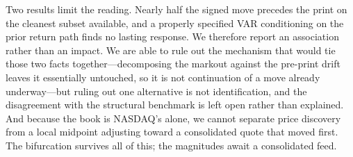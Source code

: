 \documentclass[11pt]{article}
\begin{document}
Two results limit the reading. Nearly half the signed move precedes the print on the cleanest
subset available, and a properly specified VAR conditioning on the prior return path finds no
lasting response. We therefore report an association rather than an impact. We are able to
rule out the mechanism that would tie those two facts together---decomposing the markout
against the pre-print drift leaves it essentially untouched, so it is not continuation of a
move already underway---but ruling out one alternative is not identification, and the
disagreement with the structural benchmark is left open rather than explained. And because
the book is NASDAQ's alone, we cannot separate price discovery from a local midpoint
adjusting toward a consolidated quote that moved first. The bifurcation survives all of
this; the magnitudes await a consolidated feed.


\end{document}
